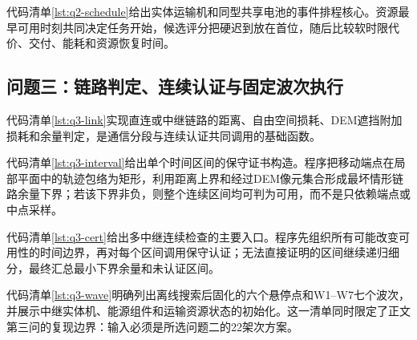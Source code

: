 

代码清单\ref{lst:q2-schedule}给出实体运输机和同型共享电池的事件排程核心。资源最早可用时刻共同决定任务开始，候选评分把硬迟到放在首位，随后比较软时限代价、交付、能耗和资源恢复时间。



\subsection{问题三：链路判定、连续认证与固定波次执行}

代码清单\ref{lst:q3-link}实现直连或中继链路的距离、自由空间损耗、DEM遮挡附加损耗和余量判定，是通信分段与连续认证共同调用的基础函数。



代码清单\ref{lst:q3-interval}给出单个时间区间的保守证书构造。程序把移动端点在局部平面中的轨迹包络为矩形，利用距离上界和经过DEM像元集合形成最坏情形链路余量下界；若该下界非负，则整个连续区间均可判为可用，而不是只依赖端点或中点采样。



代码清单\ref{lst:q3-cert}给出多中继连续检查的主要入口。程序先组织所有可能改变可用性的时间边界，再对每个区间调用保守认证；无法直接证明的区间继续递归细分，最终汇总最小下界余量和未认证区间。



代码清单\ref{lst:q3-wave}明确列出离线搜索后固化的六个悬停点和W1--W7七个波次，并展示中继实体机、能源组件和运输资源状态的初始化。这一清单同时限定了正文第三问的复现边界：输入必须是所选问题二的22架次方案。



